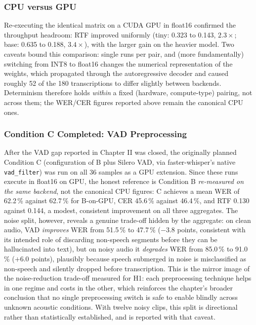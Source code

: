 \documentclass[12pt]{report}
\begin{document}
\subsubsection{CPU versus GPU}
Re-executing the identical matrix on a CUDA GPU in float16 confirmed the throughput headroom: RTF improved uniformly (tiny: 0.323 to 0.143, $2.3\times$; base: 0.635 to 0.188, $3.4\times$), with the larger gain on the heavier model. Two caveats bound this comparison: single runs per pair, and (more fundamentally) switching from INT8 to float16 changes the numerical representation of the weights, which propagated through the autoregressive decoder and caused roughly 52 of the 180 transcriptions to differ slightly between backends. Determinism therefore holds \emph{within} a fixed (hardware, compute-type) pairing, not across them; the WER/CER figures reported above remain the canonical CPU ones.
\subsubsection{Condition C Completed: VAD Preprocessing}
After the VAD gap reported in Chapter II was closed, the originally planned Condition C (configuration of B plus Silero VAD, via faster-whisper's native \texttt{vad\_filter}) was run on all 36 samples as a GPU extension. Since these runs execute in float16 on GPU, the honest reference is Condition B \emph{re-measured on the same backend}, not the canonical CPU figures: C achieves a mean WER of 62.2\,\% against 62.7\,\% for B-on-GPU, CER 45.6\,\% against 46.4\,\%, and RTF 0.130 against 0.144, a modest, consistent improvement on all three aggregates. The noise split, however, reveals a genuine trade-off hidden by the aggregate: on clean audio, VAD \emph{improves} WER from 51.5\,\% to 47.7\,\% ($-3.8$ points, consistent with its intended role of discarding non-speech segments before they can be hallucinated into text), but on noisy audio it \emph{degrades} WER from 85.0\,\% to 91.0\,\% ($+6.0$ points), plausibly because speech submerged in noise is misclassified as non-speech and silently dropped before transcription. This is the mirror image of the noise-reduction trade-off measured for H1: each preprocessing technique helps in one regime and costs in the other, which reinforces the chapter's broader conclusion that no single preprocessing switch is safe to enable blindly across unknown acoustic conditions. With twelve noisy clips, this split is directional rather than statistically established, and is reported with that caveat.
\end{document}
